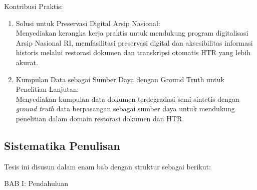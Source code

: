 \documentclass[12pt,a4paper]{article}
\begin{document}
\vspace{0.5em}



Kontribusi Praktis:
\begin{enumerate}[label=\arabic*., leftmargin=1cm]
    \item Solusi untuk Preservasi Digital Arsip Nasional: \\
    Menyediakan kerangka kerja praktis untuk mendukung program digitalisasi Arsip Nasional RI, memfasilitasi preservasi digital dan aksesibilitas informasi historis melalui restorasi dokumen dan transkripsi otomatis HTR yang lebih akurat.

    \item Kumpulan Data sebagai Sumber Daya dengan Ground Truth untuk Penelitian Lanjutan: \\
    Menyediakan kumpulan data dokumen terdegradasi semi-sintetis dengan \textit{ground truth} data berpasangan sebagai sumber daya untuk mendukung penelitian dalam domain restorasi dokumen dan HTR.
\end{enumerate}

\vspace{0.8em}
\subsection{Sistematika Penulisan}
\label{subsec:sistematika}

Tesis ini disusun dalam enam bab dengan struktur sebagai berikut:

\vspace{0.5em}
BAB I: Pendahuluan
\end{document}
